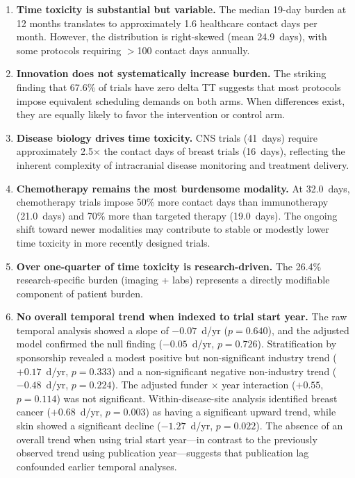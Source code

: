 \documentclass[11pt,a4paper]{article}
\begin{document}
\begin{enumerate}
    \item \textbf{Time toxicity is substantial but variable.} The median 19-day burden at 12 months translates to approximately 1.6 healthcare contact days per month. However, the distribution is right-skewed (mean 24.9~days), with some protocols requiring $>$100 contact days annually.

    \item \textbf{Innovation does not systematically increase burden.} The striking finding that 67.6\% of trials have zero delta TT suggests that most protocols impose equivalent scheduling demands on both arms. When differences exist, they are equally likely to favor the intervention or control arm.

    \item \textbf{Disease biology drives time toxicity.} CNS trials (41~days) require approximately 2.5$\times$ the contact days of breast trials (16~days), reflecting the inherent complexity of intracranial disease monitoring and treatment delivery.

    \item \textbf{Chemotherapy remains the most burdensome modality.} At 32.0~days, chemotherapy trials impose 50\% more contact days than immunotherapy (21.0~days) and 70\% more than targeted therapy (19.0~days). The ongoing shift toward newer modalities may contribute to stable or modestly lower time toxicity in more recently designed trials.

    \item \textbf{Over one-quarter of time toxicity is research-driven.} The 26.4\% research-specific burden (imaging + labs) represents a directly modifiable component of patient burden.

    \item \textbf{No overall temporal trend when indexed to trial start year.} The raw temporal analysis showed a slope of $-0.07$~d/yr ($p=0.640$), and the adjusted model confirmed the null finding ($-0.05$~d/yr, $p=0.726$). Stratification by sponsorship revealed a modest positive but non-significant industry trend ($+0.17$~d/yr, $p=0.333$) and a non-significant negative non-industry trend ($-0.48$~d/yr, $p=0.224$). The adjusted funder $\times$ year interaction ($+0.55$, $p=0.114$) was not significant. Within-disease-site analysis identified breast cancer ($+0.68$~d/yr, $p=0.003$) as having a significant upward trend, while skin showed a significant decline ($-1.27$~d/yr, $p=0.022$). The absence of an overall trend when using trial start year---in contrast to the previously observed trend using publication year---suggests that publication lag confounded earlier temporal analyses.


\end{enumerate}
\end{document}
